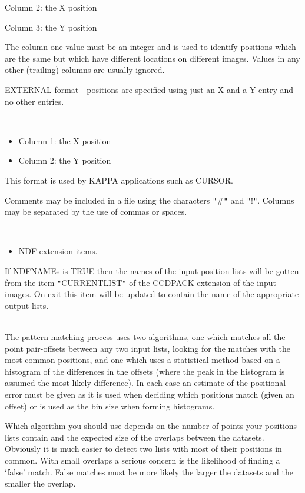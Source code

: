 \documentclass[twoside,11pt]{article}
\newcommand{\xref}[3]{#1}
\renewcommand{\_}{\texttt{\symbol{95}}}
\newcommand{\qt}[1]{{\tt "}#1{\tt "}}
\newcommand{\sstdiytopic}[2]{\item[#1:] \mbox{} \\[1.3ex] #2}
\newcommand{\sstitemlist}[1]{
  \mbox{} \\
  \vspace{-3.5ex}
  \begin{itemize}
     #1
  \end{itemize}
}
\newcommand{\sstitem}{\item}
\newcommand{\sstdiytopic}[2]{\item[{#1}] #2 }
\newcommand{\sstitemlist}[1]{
      \begin{itemize}
         #1
      \end{itemize}
      \\
   }
\newcommand{\sstitem}{\item}
\begin{document}
{{{         \sstitem
              Column 2: the X position

         \sstitem
              Column 3: the Y position

      }
        The column one value must be an integer and is used to identify
        positions which are the same but which have different locations
        on different images. Values in any other (trailing) columns are
        usually ignored.

        EXTERNAL format - positions are specified using just an X
        and a Y entry and no other entries.

      \sstitemlist{

         \sstitem
              Column 1: the X position

         \sstitem
              Column 2: the Y position

      }
        This format is used by KAPPA applications such as
        \xref{CURSOR}{sun95}{CURSOR}.

        Comments may be included in a file using the characters \qt{\#} and
        \qt{!}. Columns may be separated by the use of commas or spaces.

      \sstitemlist{

         \sstitem
         NDF extension items.

      }
        If NDFNAMEs is TRUE then the names of the input position lists
        will be gotten from the item \qt{CURRENT\_LIST} of the CCDPACK
        extension of the input images. On exit this item will be updated
        to contain the name of the appropriate output lists.
   }
   \sstdiytopic{
      Notes on Algorithms
   } {
      The pattern-matching process uses two algorithms, one which
      matches all the point pair-offsets between any two input lists,
      looking for the matches with the most common positions, and one
      which uses a statistical method based on a histogram of the
      differences in the offsets (where the peak in the histogram is
      assumed the most likely difference). In each case an estimate of
      the positional error must be given as it is used when deciding
      which positions match (given an offset) or is used as the bin
      size when forming histograms.

      Which algorithm you should use depends on the number of points
      your positions lists contain and the expected size of the overlaps
      between the datasets. Obviously it is much easier to detect two
      lists with most of their positions in common. With small overlaps
      a serious concern is the likelihood of finding a `false' match.
      False matches must be more likely the larger the datasets and the
      smaller the overlap.

}}
\end{document}
